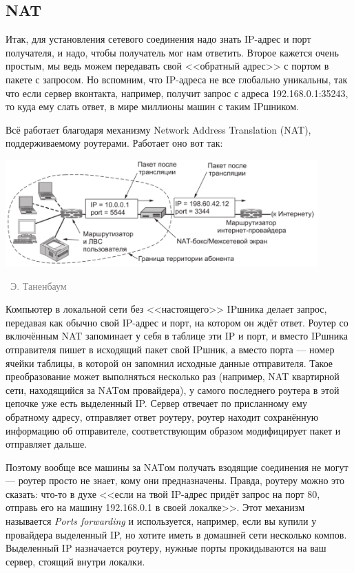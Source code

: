 \documentclass[a5paper]{article}
\newcommand{\attribution}[1] {
\vspace{-5mm}\begin{flushright}\begin{scriptsize}\textcolor{gray}{\textcopyright\, #1}\end{scriptsize}\end{flushright}
}
\begin{document}
\subsection{NAT}

Итак, для установления сетевого соединения надо знать IP-адрес и порт получателя, и надо, чтобы получатель мог нам ответить. Второе кажется очень простым, мы ведь можем передавать свой <<обратный адрес>> с портом в пакете с запросом. Но вспомним, что IP-адреса не все глобально уникальны, так что если сервер вконтакта, например, получит запрос с адреса 192.168.0.1:35243, то куда ему слать ответ, в мире миллионы машин с таким IPшником.

Всё работает благодаря механизму Network Address Translation (NAT), поддерживаемому роутерами. Работает оно вот так:

\begin{center}
    \includegraphics[width=0.9\textwidth]{nat.png}
    \attribution{Э. Таненбаум}
\end{center}

Компьютер в локальной сети без <<настоящего>> IPшника делает запрос, передавая как обычно свой IP-адрес и порт, на котором он ждёт ответ. Роутер со включённым NAT запоминает у себя в таблице эти IP и порт, и вместо IPшника отправителя пишет в исходящий пакет свой IPшник, а вместо порта --- номер ячейки таблицы, в которой он запомнил исходные данные отправителя. Такое преобразование может выполняться несколько раз (например, NAT квартирной сети, находящийся за NATом провайдера), у самого последнего роутера в этой цепочке уже есть выделенный IP. Сервер отвечает по присланному ему обратному адресу, отправляет ответ роутеру, роутер находит сохранённую информацию об отправителе, соответствующим образом модифицирует пакет и отправляет дальше.

Поэтому вообще все машины за NATом получать взодящие соединения не могут --- роутер просто не знает, кому они предназначены. Правда, роутеру можно это сказать: что-то в духе <<если на твой IP-адрес придёт запрос на порт 80, отправь его на машину 192.168.0.1 в своей локалке>>. Этот механизм называется \textit{Ports forwarding} и используется, например, если вы купили у провайдера выделенный IP, но хотите иметь в домашней сети несколько компов. Выделенный IP назначается роутеру, нужные порты прокидываются на ваш сервер, стоящий внутри локалки.
\end{document}
